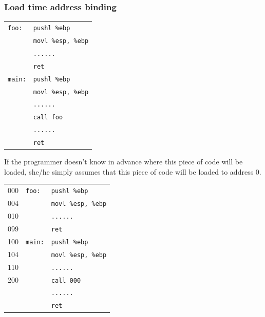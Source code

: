 \documentclass[CJKutf8,dvipsnames,table]{beamer}
\begin{document}
\begin{CJK*}{UTF8}{song}
  \begin{frame}[fragile]
    \frametitle{Load time address binding} \pause
    \begin{minipage}[c]{0.3\textwidth}
      \small
      \begin{tabular}{ll}
        \verb=foo:= & \verb=pushl %ebp=\\
        & \verb=movl %esp, %ebp=\\
        & \verb=......=\\
        & \verb=ret=\\
        \verb=main:=& \verb=pushl %ebp=\\
        & \verb=movl %esp, %ebp=\\
        & \verb=......=\\
        & \verb=call foo=\\
        & \verb=......=\\
        & \verb=ret=
      \end{tabular} \pause
      \normalsize
    \end{minipage}%
    \begin{minipage}[c]{0.3\textwidth}
      \small
      If the programmer doesn't know in advance where this piece of code will be loaded, she/he simply assumes that this piece of code will be loaded to address 0. \pause
      \normalsize
    \end{minipage}%
    \begin{minipage}[c]{0.4\textwidth}
      \small
      \begin{tabular}{lll}
        000 & \verb=foo:= & \verb=pushl %ebp=\\
        004 &              & \verb=movl %esp, %ebp=\\
        010 &              & \verb=......=\\
        099 &              & \verb=ret=\\
        100 & \verb=main:=& \verb=pushl %ebp=\\
        104 &              & \verb=movl %esp, %ebp=\\
        110 &              & \verb=......=\\
        200 &              & \verb=call 000=\\
        &              & \verb=......=\\
        &              & \verb=ret=
      \end{tabular} \pause
      \normalsize
    \end{minipage}
    \begin{itemize}

\end{itemize}
\end{frame}
\end{CJK*}
\end{document}
